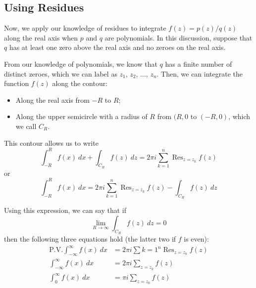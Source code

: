\documentclass{article}
\DeclareMathOperator{\Res}{Res}
\begin{document}
\subsection{Using Residues}
Now, we apply our knowledge of residues to integrate $f(z) = p(z)/q(z)$ along the real axis when $p$ and $q$ are polynomials. In this discussion, suppose that $q$ has at least one zero above the real axis and no zeroes on the real axis.

From our knowledge of polynomials, we know that $q$ has a finite number of distinct zeroes, which we can label as $z_1$, $z_2$, $\dots$, $z_n$. Then, we can integrate the function $f(z)$ along the contour:
\begin{itemize}
	\item Along the real axis from $-R$ to $R$;
	\item Along the upper semicircle with a radius of $R$ from $(R, 0$ to $(-R, 0)$, which we call $C_R$.
\end{itemize}
This contour allows us to write
\[
	\int_{-R}^R f(x)~dx + \int_{C_R} f(z)~dz 
	= 2\pi i \sum_{k=1}^n \Res_{z = z_k} f(z)
\]
or
\[
	\int_{-R}^R f(x)~dx  
	= 2\pi i \sum_{k=1}^n \Res_{z = z_k} f(z)
	- \int_{C_R} f(z)~dz
\]

Using this expression, we can say that if
\[
	\lim_{R \to \infty} \int_{C_R} f(z)~dz = 0
\]
then the following three equations hold (the latter two if $f$ is even):
\begin{align*}
	\text{P.V.}\int_{-\infty}^\infty f(x)~dx &= 2\pi i\sum{k=1}^n \Res_{z=z_k} f(z) \\
	\int_{-\infty}^\infty f(x)~dx &= 2\pi i \sum_{z=z_k} f(z) \\
	\int_{0}^\infty       f(x)~dx &=  \pi i \sum_{z=z_k} f(z)
\end{align*}
\end{document}
